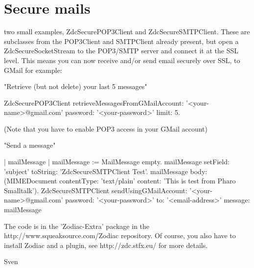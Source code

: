 \documentclass[a4paper,10pt,twoside]{book}
\begin{document}
\section{Secure mails}
 two small examples, ZdcSecurePOP3Client and ZdcSecureSMTPClient. These are subclasses from the POP3Client and SMTPClient already present, but open a ZdcSecureSocketStream to the POP3/SMTP server and connect it at the SSL level. This means you can now receive and/or send email securely over SSL, to GMail for example:

"Retrieve (but not delete) your last 5 messages"

\begin{code}{}
ZdcSecurePOP3Client
	retrieveMessagesFromGMailAccount: '<your-name>@gmail.com'
	password: '<your-password>'
	limit: 5.
\end{code}
(Note that you have to enable POP3 access in your GMail account)

"Send a message"
\begin{code}{}
| mailMessage |
mailMessage := MailMessage empty.
mailMessage setField: 'subject' toString: 'ZdcSecureSMTPClient Test'.
mailMessage body: (MIMEDocument contentType: 'text/plain' content: 'This is test from Pharo Smalltalk').
ZdcSecureSMTPClient
	sendUsingGMailAccount: '<your-name>@gmail.com' 
	password: '<your-password>'
	to: '<email-address>' 
	message: mailMessage
\end{code}
The code is in the 'Zodiac-Extra' package in the http://www.squeaksource.com/Zodiac repository.
Of course, you also have to install Zodiac and a plugin, see http://zdc.stfx.eu/ for more details.

Sven


%
%
\end{document}
